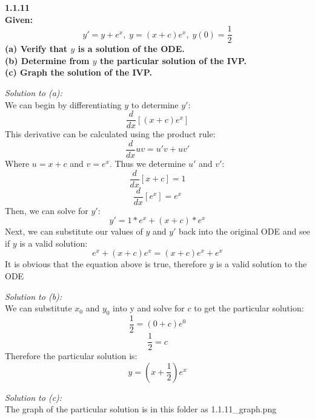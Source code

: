 \documentclass[12pt, letterpaper]{article}
\begin{document}
\setlength\parindent{0pt}
\textbf{
1.1.11\\
Given:
\[ y' = y + e^x,\; y = (x + c)e^x,\; y(0) = \frac{1}{2} \]
(a) Verify that $y$ is a solution of the ODE.\\
(b) Determine from $y$ the particular solution of the IVP.\\
(c) Graph the solution of the IVP.\\
}

\vspace{5mm}
\textit{Solution to (a):}\\
We can begin by differentiating $y$ to determine $y'$:
\[ \frac{d}{dx}[(x + c)e^x] \]
This derivative can be calculated using the product rule:
\[ \frac{d}{dx}uv = u'v + uv' \]
Where $u = x + c$ and $v = e^x$. Thus we determine $u'$ and $v'$:
\[ \frac{d}{dx}[x + c] = 1 \]
\[ \frac{d}{dx}[e^x] = e^x \]
Then, we can solve for $y'$:
\[ y' = 1*e^x + (x+c)*e^x \]
Next, we can substitute our values of $y$ and $y'$ back into the original ODE
and see if $y$ is a valid solution:
\[ e^x + (x + c)e^x = (x + c)e^x + e^x \]
It is obvious that the equation above is true, therefore $y$ is a valid solution
to the ODE

\vspace{5mm}
\textit{Solution to (b):}\\
We can substitute $x_0$ and $y_0$ into y and solve for $c$ to get the particular
solution:
\[ \frac{1}{2} = (0 + c)e^0 \] 
\[ \frac{1}{2} = c \]
Therefore the particular solution is:
\[ y = (x + \frac{1}{2})e^x \]

\vspace{5mm}
\textit{Solution to (c):}\\
The graph of the particular solution is in this folder as 1.1.11_graph.png
\end{document}
